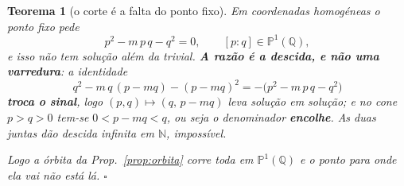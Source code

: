\documentclass[11pt,a4paper]{article}
\newtheorem{teorema}{Teorema}
\begin{document}
\begin{teorema}[o corte é a falta do ponto fixo]\label{thm:corte-fixo}
Em coordenadas homogéneas o ponto fixo pede
\[
p^{2}-m\,p\,q-q^{2}=0,\qquad [p:q]\in\mathbb{P}^1(\mathbb{Q}),
\]
e isso não tem solução além da trivial. \textbf{A razão é a descida, e não uma
varredura}: a identidade
\[
\boxed{\;q^{2}-m\,q\,(p-mq)-(p-mq)^{2}=-\bigl(p^{2}-m\,p\,q-q^{2}\bigr)\;}
\]
\textbf{troca o sinal}, logo $(p,q)\mapsto(q,\,p-mq)$ leva solução em solução; e no
cone $p>q>0$ tem-se $0<p-mq<q$, ou seja o denominador \textbf{encolhe}. As duas
juntas dão descida infinita em $\mathbb{N}$, impossível.

\emph{Logo a órbita da Prop.~\ref{prop:orbita} corre toda em $\mathbb{P}^1(\mathbb{Q})$
e o ponto para onde ela vai não está lá.} $\square$
\end{teorema}
\end{document}
